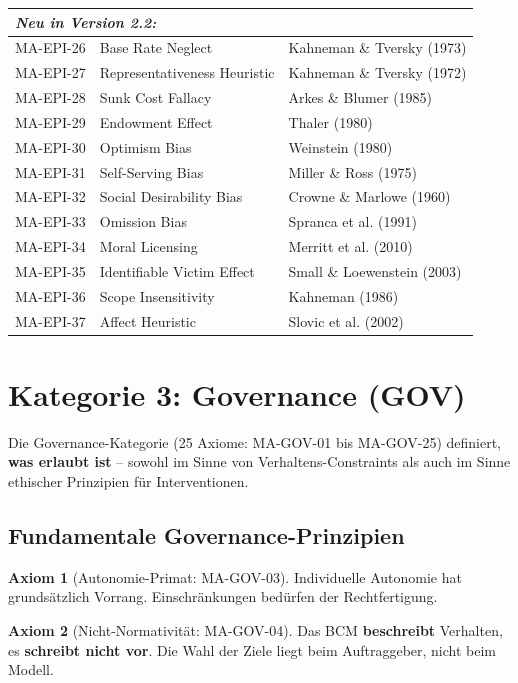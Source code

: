 \documentclass[11pt,a4paper]{article}
\theoremstyle{definition}
\newtheorem{axiom}{Axiom}[section]
\theoremstyle{plain}
\newcommand{\BCM}{\textsc{BCM}}
\begin{document}
\begin{longtable}{@{}lll@{}}
\midrule
\multicolumn{3}{l}{\textit{Neu in Version 2.2:}} \\
\midrule
MA-EPI-26 & Base Rate Neglect & Kahneman \& Tversky (1973) \\
MA-EPI-27 & Representativeness Heuristic & Kahneman \& Tversky (1972) \\
MA-EPI-28 & Sunk Cost Fallacy & Arkes \& Blumer (1985) \\
MA-EPI-29 & Endowment Effect & Thaler (1980) \\
MA-EPI-30 & Optimism Bias & Weinstein (1980) \\
MA-EPI-31 & Self-Serving Bias & Miller \& Ross (1975) \\
MA-EPI-32 & Social Desirability Bias & Crowne \& Marlowe (1960) \\
MA-EPI-33 & Omission Bias & Spranca et al. (1991) \\
MA-EPI-34 & Moral Licensing & Merritt et al. (2010) \\
MA-EPI-35 & Identifiable Victim Effect & Small \& Loewenstein (2003) \\
MA-EPI-36 & Scope Insensitivity & Kahneman (1986) \\
MA-EPI-37 & Affect Heuristic & Slovic et al. (2002) \\
\end{longtable}

\section{Kategorie 3: Governance (GOV)}

Die Governance-Kategorie (25 Axiome: MA-GOV-01 bis MA-GOV-25) definiert, \textbf{was erlaubt ist} -- sowohl im Sinne von Verhaltens-Constraints als auch im Sinne ethischer Prinzipien für Interventionen.

\subsection{Fundamentale Governance-Prinzipien}

\begin{axiom}[Autonomie-Primat: MA-GOV-03]
Individuelle Autonomie hat grundsätzlich Vorrang. Einschränkungen bedürfen der Rechtfertigung.
\end{axiom}

\begin{axiom}[Nicht-Normativität: MA-GOV-04]
Das \BCM{} \textbf{beschreibt} Verhalten, es \textbf{schreibt nicht vor}. Die Wahl der Ziele liegt beim Auftraggeber, nicht beim Modell.
\end{axiom}
\end{document}
